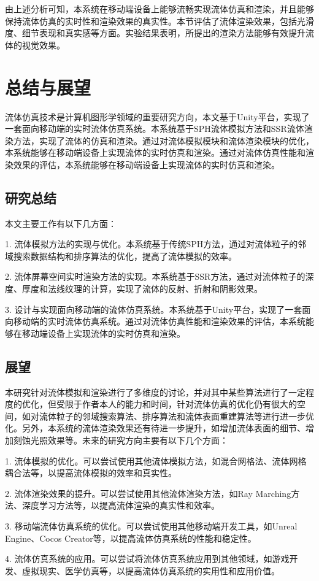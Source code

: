 由上述分析可知，本系统在移动端设备上能够流畅实现流体仿真和渲染，并且能够保持流体仿真的实时性和渲染效果的真实性。本节评估了流体渲染效果，包括光滑度、细节表现和真实感等方面。实验结果表明，所提出的渲染方法能够有效提升流体的视觉效果。


\chapter{总结与展望}
流体仿真技术是计算机图形学领域的重要研究方向，本文基于Unity平台，实现了一套面向移动端的实时流体仿真系统。本系统基于SPH流体模拟方法和SSR流体渲染方法，实现了流体的仿真和渲染。通过对流体模拟模块和流体渲染模块的优化，本系统能够在移动端设备上实现流体的实时仿真和渲染。通过对流体仿真性能和渲染效果的评估，本系统能够在移动端设备上实现流体的实时仿真和渲染。

\section{研究总结}

本文主要工作有以下几方面：

1. 流体模拟方法的实现与优化。本系统基于传统SPH方法，通过对流体粒子的邻域搜索数据结构和排序算法的优化，提高了流体模拟的效率。

2. 流体屏幕空间实时渲染方法的实现。本系统基于SSR方法，通过对流体粒子的深度、厚度和法线纹理的计算，实现了流体的反射、折射和阴影效果。

3. 设计与实现面向移动端的流体仿真系统。本系统基于Unity平台，实现了一套面向移动端的实时流体仿真系统。通过对流体仿真性能和渲染效果的评估，本系统能够在移动端设备上实现流体的实时仿真和渲染。




\section{展望}

本研究针对流体模拟和渲染进行了多维度的讨论，并对其中某些算法进行了一定程度的优化，但受限于作者本人的能力和时间，针对流体仿真的优化仍有很大的空间，如对流体粒子的邻域搜索算法、排序算法和流体表面重建算法等进行进一步优化。另外，本系统的流体渲染效果还有待进一步提升，如增加流体表面的细节、增加刻蚀光照效果等。未来的研究方向主要有以下几个方面：

1. 流体模拟的优化。可以尝试使用其他流体模拟方法，如混合网格法、流体网格耦合法等，以提高流体模拟的效率和真实性。

2. 流体渲染效果的提升。可以尝试使用其他流体渲染方法，如Ray Marching方法、深度学习方法等，以提高流体渲染的真实性和效率。

3. 移动端流体仿真系统的优化。可以尝试使用其他移动端开发工具，如Unreal Engine、Cocos Creator等，以提高流体仿真系统的性能和稳定性。

4. 流体仿真系统的应用。可以尝试将流体仿真系统应用到其他领域，如游戏开发、虚拟现实、医学仿真等，以提高流体仿真系统的实用性和应用价值。





